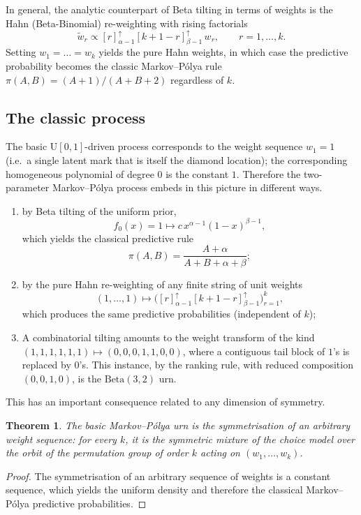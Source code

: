\documentclass[11pt,reqno]{amsart}
\newtheorem{theorem}{Theorem}[section]
\theoremstyle{definition}
\theoremstyle{remark}
\numberwithin{equation}{section}
\begin{document}
In general, the analytic counterpart of Beta tilting in terms of weights is the Hahn (Beta-Binomial) re-weighting with rising factorials
\[
\tilde{w}_r\propto[r]_{\alpha-1}^\uparrow[k+1-r]_{\beta-1}^\uparrow\,w_r,\qquad r=1,\dots,k.
\]
Setting \(w_1=\dots=w_k\) yields the pure Hahn weights, in which case the predictive probability becomes the classic Markov--P\'olya rule \(\pi(A,B)=(A+1)/(A+B+2)\) regardless of \(k\).

\subsection{The classic process}

The basic \(\mathrm{U}[0,1]\)-driven process corresponds to the weight sequence \(w_1=1\) (i.e.\ a single latent mark that is itself the diamond location); the corresponding homogeneous polynomial of degree \(0\) is the constant \(1\). Therefore the two-parameter Markov--P\'olya process embeds in this picture in different ways.

\begin{enumerate}[label=(\roman*)]
\item by Beta tilting of the uniform prior,
\[
f_0(x)=1\mapsto c\,x^{\alpha-1}(1-x)^{\beta-1},
\]
which yields the classical predictive rule
\[
\pi(A,B)=\frac{A+\alpha}{A+B+\alpha+\beta};
\]
\item by the pure Hahn re-weighting of any finite string of unit weights
\[
(1,\dots,1)\mapsto\bigl([r]_{\alpha-1}^\uparrow[k+1-r]_{\beta-1}^\uparrow\bigr)_{r=1}^k,
\]
which produces the same predictive probabilities (independent of \(k\));
\item A combinatorial tilting amounts to the weight transform of the kind \((1,1,1,1,1,1)\mapsto(0,0,0,1,1,0,0)\), where a contiguous tail block of \(1\)'s is replaced by \(0\)'s. This instance, by the ranking rule, with reduced composition \((0,0,1,0)\), is the \(\mathrm{Beta}(3,2)\) urn.
\end{enumerate}

This has an important consequence related to any dimension of symmetry.

\begin{theorem}
The basic Markov--P\'olya urn is the symmetrisation of an arbitrary weight sequence: for every \(k\), it is the symmetric mixture of the choice model over the orbit of the permutation group of order \(k\) acting on \((w_1,\dots,w_k)\).
\end{theorem}

\begin{proof}
The symmetrisation of an arbitrary sequence of weights is a constant sequence, which yields the uniform density and therefore the classical Markov--P\'olya predictive probabilities.
\end{proof}
\end{document}
